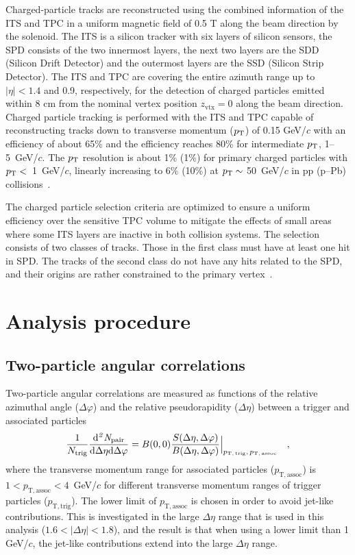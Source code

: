 Charged-particle tracks are reconstructed using the combined information of the ITS and TPC in a uniform magnetic field of 0.5 T along the beam direction by the solenoid. The ITS is a silicon tracker with six layers of silicon sensors, the SPD consists of the two innermost layers, the next two layers are the SDD (Silicon Drift Detector) and the outermost layers are the SSD (Silicon Strip Detector). The ITS and TPC are covering the entire azimuth range up to $|\eta|<1.4$ and 0.9, respectively, for the detection of charged particles emitted within 8 cm from the nominal vertex position $z_\mathrm{vtx}=0$ along the beam direction. Charged particle tracking is performed with the ITS and TPC capable of reconstructing tracks down to transverse momentum ($p_\mathrm{T}$) of 0.15 GeV/$c$ with an efficiency of about 65\% and the efficiency reaches 80\% for intermediate $p_\mathrm{T}$, 1--5~GeV/$c$. The $p_\mathrm{T}$ resolution is about 1\% (1\%) for primary charged particles with $p_\mathrm{T}<$~1~GeV/$c$, linearly increasing to 6\% (10\%) at $p_\mathrm{T}\sim$ 50~GeV/$c$ in pp (p--Pb) collisions~\cite{ALICE:2018vuu}. 

The charged particle selection criteria are optimized to ensure a uniform efficiency over the sensitive TPC volume to mitigate the effects of small areas where some ITS layers are inactive in both collision systems. The selection consists of two classes of tracks. Those in the first class must have at least one hit in SPD. The tracks of the second class do not have any hits related to the SPD, and their origins are rather constrained to the primary vertex~\cite{ALICE:2012eyl}. 

\section{Analysis procedure}
\label{sec:ana}
\subsection{Two-particle angular correlations}
Two-particle angular correlations are measured as functions of the relative azimuthal angle ($\Delta\varphi$) and the relative pseudorapidity ($\Delta\eta$) between a trigger and associated particles
\begin{eqnarray}
\frac{1}{N_{\rm{trig}}} \frac{ \rm{d}\it{}^{2} N_{\rm{pair}} }{ \rm{d} \Delta\eta \rm{d}\Delta\varphi} = B(0, 0)\frac{S(\Delta\eta, \Delta\varphi)}{B(\Delta\eta, \Delta\varphi)}  \Big\lvert_{p_\mathrm{T,\,trig},\,p_\mathrm{T,\,assoc}}\quad , 
\label{eq:corrfunction}
\end{eqnarray}
where the transverse momentum range for associated particles ($p_\mathrm{T,assoc}$) is $1<p_\mathrm{T,assoc}<4$~GeV/$c$ for different transverse momentum ranges of trigger particles ($p_\mathrm{T,trig}$).
The lower limit of $p_\mathrm{T,assoc}$ is chosen in order to avoid jet-like contributions. 
This is investigated in the large $\Delta\eta$ range that is used in this analysis ($1.6<|\Delta\eta|<1.8$), and the result is that when using a lower limit than 1 GeV/$c$, the jet-like contributions extend into the large $\Delta\eta$ range.

